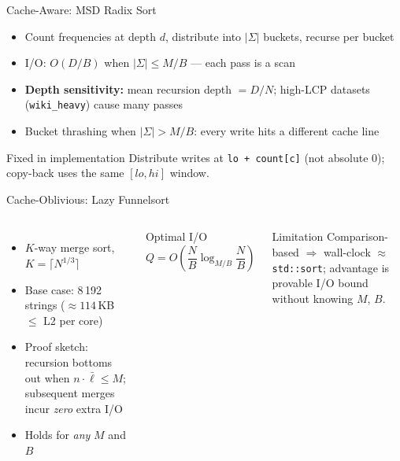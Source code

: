\documentclass[aspectratio=169]{beamer}
\begin{document}
\begin{frame}{Cache-Aware: MSD Radix Sort}
  \begin{itemize}
    \item Count frequencies at depth $d$, distribute into $|\Sigma|$ buckets,
          recurse per bucket
    \item I/O: $O(D/B)$ when $|\Sigma|\le M/B$ — each pass is a scan
    \item \textbf{Depth sensitivity:} mean recursion depth $= D/N$;
          high-LCP datasets (\texttt{wiki\_heavy}) cause many passes
    \item \alert{Bucket thrashing} when $|\Sigma| > M/B$: every write hits a
          different cache line
  \end{itemize}
  \vspace{0.3em}
  \begin{alertblock}{Fixed in implementation}
    Distribute writes at \texttt{lo + count[c]} (not absolute 0);
    copy-back uses the same $[lo, hi]$ window.
  \end{alertblock}
\end{frame}

\begin{frame}{Cache-Oblivious: Lazy Funnelsort}
  \begin{columns}
      \begin{itemize}
        \item $K$-way merge sort, $K = \lceil N^{1/3}\rceil$
        \item Base case: 8\,192 strings
              ($\approx 114$\,KB $\le$ L2 per core)
        \item Proof sketch: recursion bottoms out when
              $n\cdot\bar\ell \le M$;
              subsequent merges incur \emph{zero} extra I/O
        \item Holds for \emph{any} $M$ and $B$
      \end{itemize}
      \begin{block}{Optimal I/O}
        \[ Q = O\!\left(\frac{N}{B}\log_{M/B}\frac{N}{B}\right) \]
      \end{block}
      \begin{block}{Limitation}
        Comparison-based $\Rightarrow$
        wall-clock $\approx$ \texttt{std::sort};
        advantage is provable I/O bound
        without knowing $M$, $B$.
      \end{block}
  \end{columns}
\end{frame}
\end{document}
